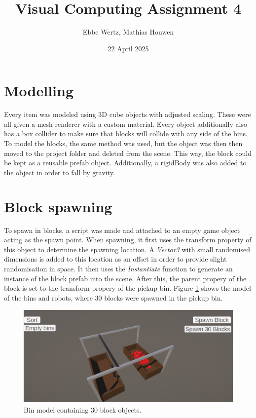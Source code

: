 \documentclass{report}
\title{Visual Computing Assignment 4}
\author{Ebbe Wertz, Mathias Houwen}
\date{22 April 2025}
\begin{document}
\maketitle

\section{Modelling}

Every item was modeled using 3D cube objects with adjusted scaling. These were all given a mesh renderer with a custom material. Every object additionally also has a box collider to make sure that blocks will collide with any side of the bins. \\
To model the blocks, the same method was used, but the object was then then moved to the project folder and deleted from the scene. This way, the block could be kept as a reusable prefab object. Additionally, a rigidBody was also added to the object in order to fall by gravity.\\

\section{Block spawning}

To spawn in blocks, a script was made and attached to an empty game object acting as the spawn point. When spawning, it first uses the transform property of this object to determine the spawning location. A \textit{Vector3} with small randomised dimensions is added to this location as an offset in order to provide slight randomisation in space. It then uses the \textit{Instantiate} function to generate an instance of the block prefab into the scene. After this, the parent propery of the block is set to the transform propery of the pickup bin. Figure \ref{fig:30spawn} shows the model of the bins and robots, where 30 blocks were spawned in the pickup bin.

\begin{figure}[H]
\centering
\includegraphics[height=50mm, keepaspectratio]{report_images/30spawn.png}
\caption{Bin model containing 30 block objects.}
\label{fig:30spawn}
\end{figure}
\end{document}
